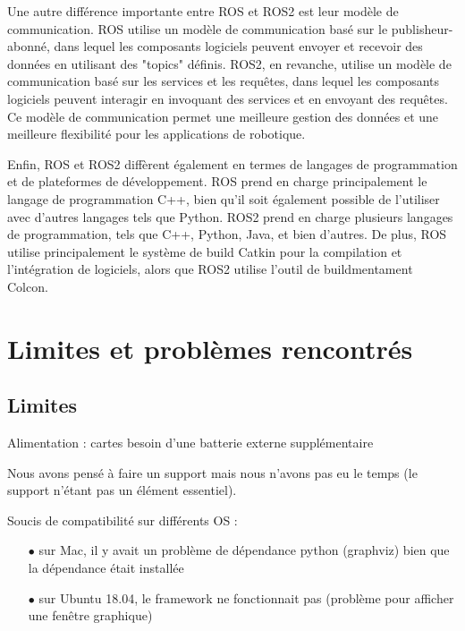 Une autre différence importante entre ROS et ROS2 est leur modèle de communication. ROS utilise un modèle de communication basé 
sur le publisheur-abonné, dans lequel les composants logiciels peuvent envoyer et recevoir des données en utilisant des "topics" définis. 
ROS2, en revanche, utilise un modèle de communication basé sur les services et les requêtes, dans lequel les composants logiciels peuvent 
interagir en invoquant des services et en envoyant des requêtes. Ce modèle de communication permet une meilleure gestion des données et 
une meilleure flexibilité pour les applications de robotique. 
\linebreak

Enfin, ROS et ROS2 diffèrent également en termes de langages de programmation et de plateformes de développement. 
ROS prend en charge principalement le langage de programmation C++, bien qu'il soit également possible de l'utiliser avec d'autres 
langages tels que Python. ROS2 prend en charge plusieurs langages de programmation, tels que C++, Python, Java, et bien d'autres. 
De plus, ROS utilise principalement le système de build Catkin pour la compilation et l'intégration de logiciels, alors que 
ROS2 utilise l'outil de buildmentament Colcon. 

		\section{Limites et problèmes rencontrés}

			\subsection{Limites}

Alimentation : cartes besoin d'une batterie externe supplémentaire 

Nous avons pensé à faire un support mais nous n'avons pas eu le temps (le support n'étant pas un élément essentiel).

Soucis de compatibilité sur différents OS :  
\begin{itemize}
	\item[$\bullet$] sur Mac, il y avait un problème de dépendance python (graphviz) bien que la dépendance était installée
	\item[$\bullet$]sur Ubuntu 18.04, le framework ne fonctionnait pas (problème pour afficher une fenêtre graphique)
\end{itemize}

